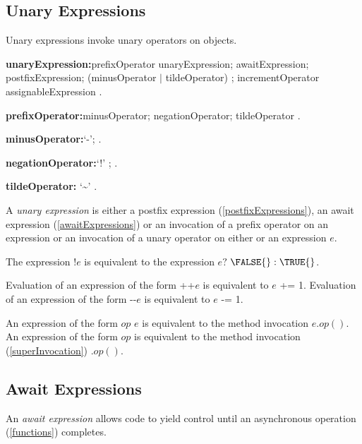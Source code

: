 \documentclass{article}
\newcommand{\code}[1]{{\sf #1}}
\begin{document}
\subsection{ Unary Expressions}

\LMHash{}
Unary expressions invoke unary operators on objects.

\begin{grammar}
{\bf unaryExpression:}prefixOperator unaryExpression;
      awaitExpression;
      postfixExpression;
      (minusOperator $|$ tildeOperator) \SUPER{};
      incrementOperator assignableExpression
    .
 
 {\bf prefixOperator:}minusOperator;
      negationOperator;
      tildeOperator
    .
       
       
  {\bf minusOperator:}`-';  .


    {\bf negationOperator:}`!' ;
      .
      
    {\bf tildeOperator:}  `\~{}'
    .
    
    
\end{grammar}

\LMHash{}
A {\em unary expression} is either a postfix expression  (\ref{postfixExpressions}), an await expression (\ref{awaitExpressions}) or an invocation of a prefix operator on an expression or an invocation of a unary operator on either \SUPER{} or an expression $e$.

\LMHash{}
The expression $!e$ is equivalent to the expression $e?$ $ \FALSE{} :\TRUE{}$. 

\LMHash{}
Evaluation of an expression of the form \code{++$e$} is equivalent to \code{$e$ += 1}.  Evaluation of an expression of the form \code{-{}-$e$} is equivalent to \code{$e$ -= 1}. 


\LMHash{}
An expression of the form \code{$op$ $e$} is equivalent to the method invocation \code{$e.op()$}. An expression of the form \code{$op$ \SUPER{}} is equivalent to the method invocation  (\ref{superInvocation}) \code{\SUPER{}.$op()$}.

\subsection{ Await Expressions}

\LMHash{}
An {\em await expression} allows code to yield control until an asynchronous operation (\ref{functions}) completes. 
\end{document}
